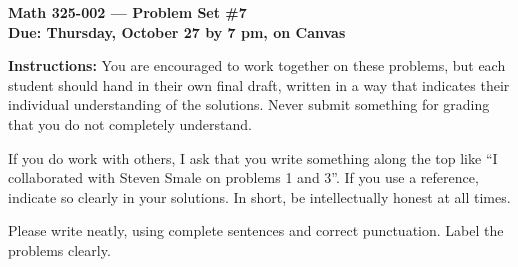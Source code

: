 \documentclass{amsart}
\begin{document}
\begin{center}
{\large\bfseries
Math 325-002 --- Problem Set \#7 \\
Due: Thursday, October 27 by 7 pm, on Canvas}
\end{center}





{\bf Instructions:} You are encouraged to work together on these
problems, but each student should hand in their own final draft,
written in a way that indicates their individual understanding of
the solutions. Never submit something for grading
that you do not completely understand. 

If you do work with others, I ask that you write something along the
top like ``I collaborated with Steven Smale on problems 1 and 3''.
If you use a reference, indicate so clearly in your solutions. 
In short, be intellectually
honest at all times.

Please write neatly, using complete sentences and correct
punctuation. Label the problems clearly. 
\end{document}
